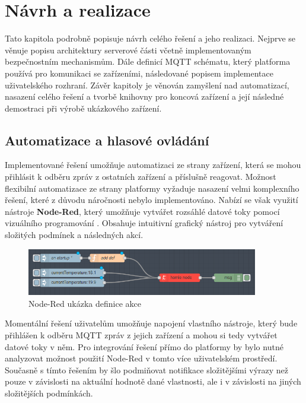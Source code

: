\chapter{Návrh a realizace}
Tato kapitola podrobně popisuje návrh celého řešení a jeho realizaci. Nejprve se věnuje popisu architektury serverové části včetně implementovaným bezpečnostním mechanismům. Dále definicí MQTT schématu, který platforma používá pro komunikaci se zařízeními, následované popisem implementace uživatelského rozhraní. Závěr kapitoly je věnován zamyšlení nad automatizací, nasazení celého řešení a tvorbě knihovny pro koncová zařízení a její následné demostraci při výrobě ukázkového zařízení.





\section{Automatizace a hlasové ovládání}
Implementované řešení umožňuje automatizaci ze strany zařízení, která se mohou přihlásit k odběru zpráv z ostatních zařízení a příslušně reagovat. Možnost flexibilní automatizace ze strany platformy vyžaduje nasazení velmi komplexního řešení, které z důvodu náročnosti nebylo implementováno. Nabízí se však využití nástroje \textbf{Node-Red}, který umožňuje vytvářet rozsáhlé datové toky pomocí vizuálního programování \cite{node-red}. Obsahuje intuitivní grafický nástroj pro vytváření složitých podmínek a následných akcí.

\begin{figure}[htbp]
    \centering
    \includegraphics[width=0.9\textwidth]{img/homie-node-node.png}
    \caption{Node-Red ukázka definice akce \cite{node-red-homie}}
\end{figure}

Momentální řešení uživatelům umožňuje napojení vlastního nástroje, který bude přihlášen k odběru MQTT zpráv z jejich zařízení a mohou si tedy vytvářet datové toky v něm. Pro integrování řešení přímo do platformy by bylo nutné analyzovat možnost použití Node-Red v tomto více uživatelském prostředí. Současně s tímto řešením by šlo podmiňovat notifikace složitějšími výrazy než pouze v závislosti na aktuální hodnotě dané vlastnosti, ale i v závislosti na jiných složitějších podmínkách.

